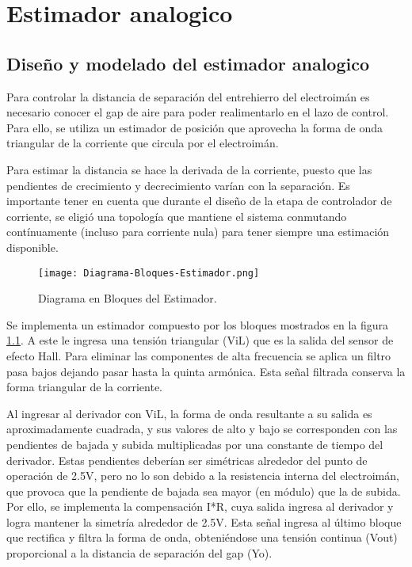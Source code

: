 \chapter{Estimador analogico}  \label{cap:Estimador Analogico}

\section{Diseño y modelado del estimador analogico}

\noindent Para controlar la distancia de separaci\'{o}n del entrehierro del electroim\'{a}n es necesario conocer el gap de aire para poder realimentarlo en el lazo de control.  Para ello, se utiliza un estimador de posici\'{o}n que aprovecha la forma de onda triangular de la corriente que circula por el electroim\'{a}n. 



\noindent Para estimar la distancia se hace la derivada de la corriente, puesto que las pendientes de crecimiento y decrecimiento var\'{i}an con la separaci\'{o}n. Es importante tener en cuenta que durante el dise\~{n}o de la etapa de controlador de corriente, se eligi\'{o} una topolog\'{i}a que mantiene el sistema conmutando cont\'{i}nuamente (incluso para corriente nula) para tener siempre una estimaci\'{o}n disponible.

\begin{figure}[H]
	\centering
	\texttt{[image: Diagrama-Bloques-Estimador.png]}
	\caption{Diagrama en Bloques del Estimador.}
	\label{fig:img_Diagrama-Bloques-Estimador.png}
\end{figure}

\noindent Se implementa un estimador compuesto por los bloques mostrados en la figura \ref{fig:img_Diagrama-Bloques-Estimador.png}. A este le ingresa una tensi\'{o}n triangular (ViL) que es la salida del sensor de efecto Hall. Para eliminar las componentes de alta frecuencia se aplica un filtro pasa bajos dejando pasar hasta la quinta arm\'{o}nica. Esta se\~{n}al filtrada conserva la forma triangular de la corriente. 



\noindent Al ingresar al derivador con ViL, la forma de onda resultante a su salida es aproximadamente cuadrada, y sus valores de alto y bajo se corresponden con las pendientes de bajada y subida multiplicadas por una constante de tiempo del derivador. Estas pendientes deber\'{i}an ser sim\'{e}tricas alrededor del punto de operaci\'{o}n de 2.5V, pero no lo son debido a la resistencia interna del electroim\'{a}n, que provoca que la pendiente de bajada sea mayor (en m\'{o}dulo) que la de subida. Por ello, se implementa la compensaci\'{o}n I*R, cuya salida ingresa al derivador y logra mantener la simetr\'{i}a alrededor de 2.5V. Esta se\~{n}al ingresa al \'{u}ltimo bloque que rectifica y filtra la forma de onda, obteni\'{e}ndose una tensi\'{o}n continua (Vout) proporcional a la distancia de separaci\'{o}n del gap (Yo).


